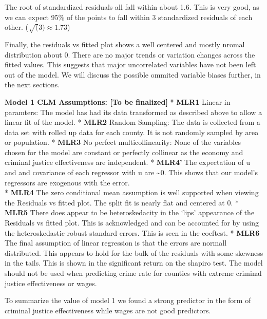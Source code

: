 \documentclass[]{article}
\newenvironment{Shaded}{}{}
\newcommand{\CommentTok}[1]{\textcolor[rgb]{0.00,0.50,0.00}{#1}}
\newcommand{\KeywordTok}[1]{\textcolor[rgb]{0.00,0.00,1.00}{#1}}
\newcommand{\NormalTok}[1]{#1}
\begin{document}
The root of standardized residuals all fall within about 1.6. This is
very good, as we can expect 95\% of the points to fall within 3
standardized residuals of each other. (\(\sqrt(3) \approx 1.73\))

Finally, the residuals vs fitted plot shows a well centered and mostly
nromal distribution about 0. There are no major trends or variation
changes across the fitted values. This suggests that major uncorrelated
variables have not been left out of the model. We will discuss the
possible ommited variable biases further, in the next sections.

\textbf{Model 1 CLM Assumptions: {[}To be finalized{]}} * \textbf{MLR1}
Linear in paramters: The model has had its data transformed as described
above to allow a linear fit of the model. * \textbf{MLR2} Random
Sampling: The data is collected from a data set with rolled up data for
each county. It is not randomly sampled by area or population. *
\textbf{MLR3} No perfect multicollinearity: None of the variables chosen
for the model are constant or perfectly collinear as the economy and
criminal justice effectiveness are independent. * \textbf{MLR4'} The
expectation of u and and covariance of each regressor with u are
\textasciitilde{}0. This shows that our model's regressors are exogenous
with the error.\\
* \textbf{MLR4} The zero conditional mean assumption is well supported
when viewing the Residuals vs fitted plot. The split fit is nearly flat
and centered at 0. * \textbf{MLR5} There does appear to be
heteroskedacity in the `lips' appearance of the Residuals vs fitted
plot. This is acknowledged and can be accounted for by using the
heteroskedastic robust standard errors. This is seen in the coeftest. *
\textbf{MLR6} The final assumption of linear regression is that the
errors are normall distributed. This appears to hold for the bulk of the
residuals with some skewness in the tails. This is shown in the
significant return on the shapiro test. The model should not be used
when predicting crime rate for counties with extreme criminal justice
effectiveness or wages.

To summarize the value of model 1 we found a strong predictor in the
form of criminal justice effectiveness while wages are not good
predictors.

\begin{Shaded}
\end{Shaded}
\end{document}
